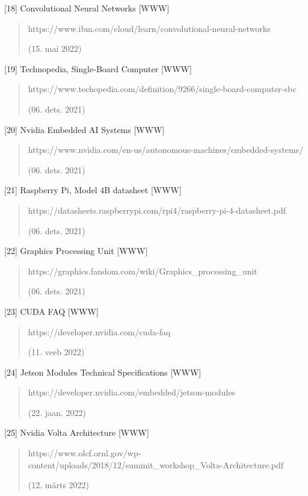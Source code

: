 \documentclass[12pt,a4paper]{report}
\begin{document}
{[}18{]} Convolutional Neural Networks {[}WWW{]}

\begin{quote}
https://www.ibm.com/cloud/learn/convolutional-neural-networks

(15. mai 2022)
\end{quote}

{[}19{]} Technopedia, Single-Board Computer {[}WWW{]}

\begin{quote}
https://www.techopedia.com/definition/9266/single-board-computer-sbc

(06. dets. 2021)
\end{quote}

{[}20{]} Nvidia Embedded AI Systems {[}WWW{]}

\begin{quote}
https://www.nvidia.com/en-us/autonomous-machines/embedded-systems/

(06. dets. 2021)
\end{quote}

{[}21{]} Raspberry Pi, Model 4B datasheet {[}WWW{]}

\begin{quote}
https://datasheets.raspberrypi.com/rpi4/raspberry-pi-4-datasheet.pdf

(06. dets. 2021)
\end{quote}

{[}22{]} Graphics Processing Unit {[}WWW{]}

\begin{quote}
https://graphics.fandom.com/wiki/Graphics\_processing\_unit

(06. dets. 2021)
\end{quote}

{[}23{]} CUDA FAQ {[}WWW{]}

\begin{quote}
https://developer.nvidia.com/cuda-faq

(11. veeb 2022)
\end{quote}

{[}24{]} Jetson Modules Technical Specifications {[}WWW{]}

\begin{quote}
https://developer.nvidia.com/embedded/jetson-modules

(22. jaan. 2022)
\end{quote}

{[}25{]} Nvidia Volta Architecture {[}WWW{]}

\begin{quote}
https://www.olcf.ornl.gov/wp-content/uploads/2018/12/summit\_workshop\_Volta-Architecture.pdf

(12. märts 2022)
\end{quote}
\end{document}
